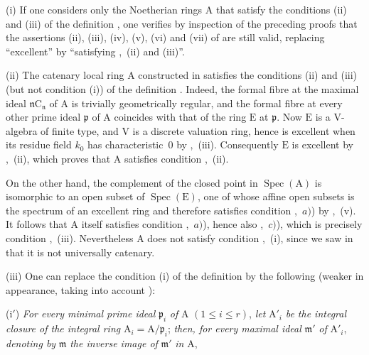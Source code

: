 \begin{remarks}[7.8.4]
\label{IV.7.8.4}
(i) If one considers only the Noetherian rings $\mathrm{A}$ that satisfy the conditions (ii) and (iii) of the definition , one verifies by inspection of the preceding proofs that the assertions (ii), (iii), (iv), (v), (vi) and (vii) of  are still valid, replacing ``excellent'' by ``satisfying ,~(ii) and (iii)''.

(ii) The catenary local ring $\mathrm{A}$ constructed in  satisfies the conditions (ii) and (iii) (but not condition (i)) of the definition . Indeed, the formal fibre at the maximal ideal $\mathfrak{n}\mathrm{C}_\mathfrak{n}$ of $\mathrm{A}$ is trivially geometrically regular, and the formal fibre at every other prime ideal $\mathfrak{p}$ of $\mathrm{A}$ coincides with that of the ring $\mathrm{E}$ at $\mathfrak{p}$. Now $\mathrm{E}$ is a $\mathrm{V}$-algebra of finite type, and $\mathrm{V}$ is a discrete valuation ring, hence is excellent when its residue field $k_0$ has characteristic~$0$ by ,~(iii). Consequently $\mathrm{E}$ is excellent by ,~(ii), which proves that $\mathrm{A}$ satisfies condition ,~(ii).


On the other hand, the complement of the closed point in $\operatorname{Spec}(\mathrm{A})$ is isomorphic to an open subset of $\operatorname{Spec}(\mathrm{E})$, one of whose affine open subsets is the spectrum of an excellent ring and therefore satisfies condition ,~$a)$) by ,~(v). It follows that $\mathrm{A}$ itself satisfies condition ,~$a)$), hence also ,~$c)$), which is precisely condition ,~(iii). Nevertheless $\mathrm{A}$ does not satisfy condition ,~(i), since we saw in  that it is not universally catenary.

(iii) One can replace the condition (i) of the definition  by the following (weaker in appearance, taking into account ):

(i$'$) \emph{For every minimal prime ideal} $\mathfrak{p}_i$ \emph{of} $\mathrm{A}$ $(1\leqslant i\leqslant r)$, \emph{let} $\mathrm{A}'_i$ \emph{be the integral closure of the integral ring} $\mathrm{A}_i=\mathrm{A}/\mathfrak{p}_i$; \emph{then, for every maximal ideal} $\mathfrak{m}'$ \emph{of} $\mathrm{A}'_i$, \emph{denoting by} $\mathfrak{m}$ \emph{the inverse image of} $\mathfrak{m}'$ \emph{in} $\mathrm{A}$,


\end{remarks}
